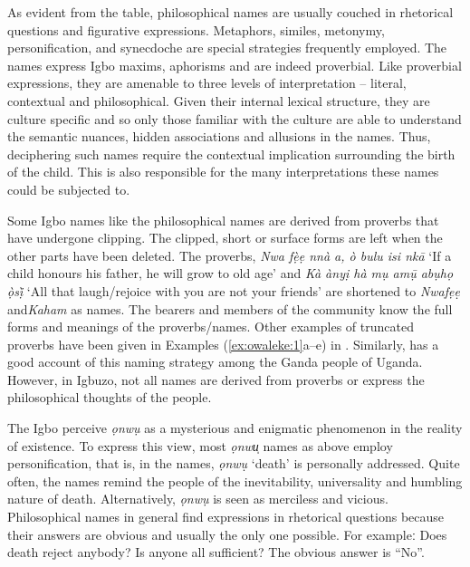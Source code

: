 \documentclass[output=paper]{langscibook}
\begin{document}
As evident from the table, philosophical names are usually couched in rhetorical questions and figurative expressions. Metaphors, similes, metonymy, personification, and synecdoche are special strategies frequently employed. The names express Igbo maxims, aphorisms and are indeed proverbial. Like proverbial expressions, they are amenable to three levels of interpretation -- literal, contextual and philosophical. Given their internal lexical structure, they are culture specific and so only those familiar with the culture are able to understand the semantic nuances, hidden associations and allusions in the names. Thus, deciphering such names require the contextual implication surrounding the birth of the child. This is also responsible for the many interpretations these names could be subjected to.  

Some Igbo names like the philosophical names are derived from proverbs that have undergone clipping. The clipped, short or surface forms are left when the other parts have been deleted. The proverbs, \textit{Nwa fẹ̀ẹ nnà a, ò bulu isi nkā} ‘If a child honours his father, he will grow to old age’ and \textit{Kà ànyị hà mụ amụ̄ abụhọ ọ̀sị̀} ‘All that laugh/rejoice with you are not your friends’ are shortened to \textit{Nwafẹe}̣ and\textit{Kaham }as names. The bearers and members of the community know the full forms and meanings of the proverbs/names. Other examples of truncated proverbs have been given in Examples (\ref{ex:owaleke:1}a--e) in . Similarly, \citet{Musere1999} has a good account of this naming strategy among the Ganda people of Uganda. However, in Igbuzo, not all names are derived from proverbs or express the philosophical thoughts of the people.

The Igbo perceive \textit{ọnwụ} as a mysterious and enigmatic phenomenon in the reality of existence.  To express this view, most \textit{ọnwu̩} names as above employ personification, that is, in the names, \textit{ọnwu}̣ ‘death’ is personally addressed. Quite often, the names remind the people of the inevitability, universality and humbling nature of death. Alternatively, \textit{ọnwụ} is seen as merciless and vicious. Philosophical names in general find expressions in rhetorical questions because their answers are obvious and usually the only one possible. For exampleː Does death reject anybody?  Is anyone all sufficient? The obvious answer is ``No''. 
\end{document}
